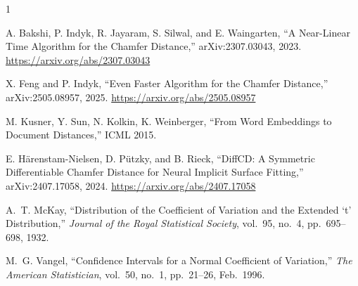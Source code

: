 \documentclass[conference]{IEEEtran}
\begin{document}
\begin{thebibliography}{1}

A. Bakshi, P. Indyk, R. Jayaram, S. Silwal, and E. Waingarten,
``A Near-Linear Time Algorithm for the Chamfer Distance,''
arXiv:2307.03043, 2023.
\url{https://arxiv.org/abs/2307.03043}

X. Feng and P. Indyk,
``Even Faster Algorithm for the Chamfer Distance,''
arXiv:2505.08957, 2025.
\url{https://arxiv.org/abs/2505.08957}

M. Kusner, Y. Sun, N. Kolkin, K. Weinberger,
``From Word Embeddings to Document Distances,''
ICML 2015.

E. H\"arenstam-Nielsen, D. P\"utzky, and B. Rieck,
``DiffCD: A Symmetric Differentiable Chamfer Distance for Neural
Implicit Surface Fitting,''
arXiv:2407.17058, 2024.
\url{https://arxiv.org/abs/2407.17058}

A.~T. McKay,
``Distribution of the Coefficient of Variation and the Extended
`t' Distribution,''
\emph{Journal of the Royal Statistical Society},
vol.~95, no.~4, pp.~695--698, 1932.

M.~G. Vangel,
``Confidence Intervals for a Normal Coefficient of Variation,''
\emph{The American Statistician},
vol.~50, no.~1, pp.~21--26, Feb.\ 1996.

\end{thebibliography}
\end{document}
